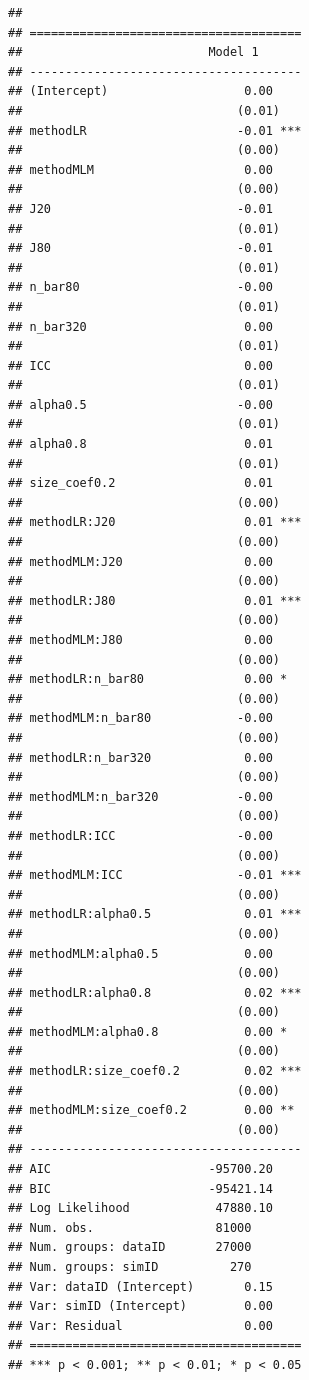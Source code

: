\documentclass[
]{book}
\begin{document}
\begin{verbatim}
## 
## ======================================
##                          Model 1      
## --------------------------------------
## (Intercept)                   0.00    
##                              (0.01)   
## methodLR                     -0.01 ***
##                              (0.00)   
## methodMLM                     0.00    
##                              (0.00)   
## J20                          -0.01    
##                              (0.01)   
## J80                          -0.01    
##                              (0.01)   
## n_bar80                      -0.00    
##                              (0.01)   
## n_bar320                      0.00    
##                              (0.01)   
## ICC                           0.00    
##                              (0.01)   
## alpha0.5                     -0.00    
##                              (0.01)   
## alpha0.8                      0.01    
##                              (0.01)   
## size_coef0.2                  0.01    
##                              (0.00)   
## methodLR:J20                  0.01 ***
##                              (0.00)   
## methodMLM:J20                 0.00    
##                              (0.00)   
## methodLR:J80                  0.01 ***
##                              (0.00)   
## methodMLM:J80                 0.00    
##                              (0.00)   
## methodLR:n_bar80              0.00 *  
##                              (0.00)   
## methodMLM:n_bar80            -0.00    
##                              (0.00)   
## methodLR:n_bar320             0.00    
##                              (0.00)   
## methodMLM:n_bar320           -0.00    
##                              (0.00)   
## methodLR:ICC                 -0.00    
##                              (0.00)   
## methodMLM:ICC                -0.01 ***
##                              (0.00)   
## methodLR:alpha0.5             0.01 ***
##                              (0.00)   
## methodMLM:alpha0.5            0.00    
##                              (0.00)   
## methodLR:alpha0.8             0.02 ***
##                              (0.00)   
## methodMLM:alpha0.8            0.00 *  
##                              (0.00)   
## methodLR:size_coef0.2         0.02 ***
##                              (0.00)   
## methodMLM:size_coef0.2        0.00 ** 
##                              (0.00)   
## --------------------------------------
## AIC                      -95700.20    
## BIC                      -95421.14    
## Log Likelihood            47880.10    
## Num. obs.                 81000       
## Num. groups: dataID       27000       
## Num. groups: simID          270       
## Var: dataID (Intercept)       0.15    
## Var: simID (Intercept)        0.00    
## Var: Residual                 0.00    
## ======================================
## *** p < 0.001; ** p < 0.01; * p < 0.05
\end{verbatim}
\end{document}
